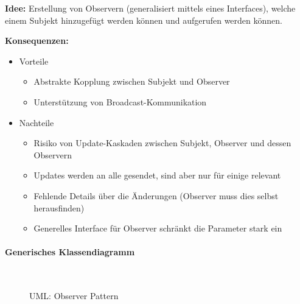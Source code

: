 \documentclass[ngerman]{tuda_summary}
\begin{document}
\textbf{Idee:} Erstellung von Observern (generalisiert mittels eines Interfaces), welche einem Subjekt hinzugefügt werden können und aufgerufen werden können.

\textbf{Konsequenzen:}
\begin{itemize}
    \item Vorteile
          \begin{itemize}
              \item Abstrakte Kopplung zwischen Subjekt und Observer
              \item Unterstützung von Broadcast-Kommunikation
          \end{itemize}
    \item Nachteile
          \begin{itemize}
              \item Risiko von Update-Kaskaden zwischen Subjekt, Observer und dessen Observern
              \item Updates werden an alle gesendet, sind aber nur für einige relevant
              \item Fehlende Details über die Änderungen (Observer muss dies selbst herausfinden)
              \item Generelles Interface für Observer schränkt die Parameter stark ein
          \end{itemize}
\end{itemize}

\paragraph{Generisches Klassendiagramm}\mbox{}\\
\begin{figure}[ht]
    \centering
    \caption{UML: Observer Pattern}
\end{figure}
\end{document}
